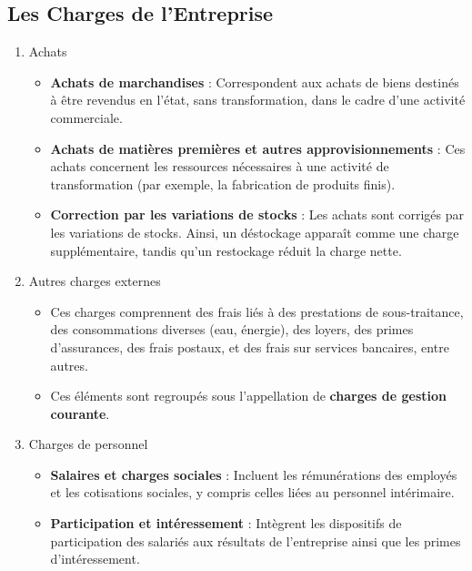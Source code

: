 \documentclass[a4paper, 12pt]{report}
\begin{document}
\subsection{Les Charges de l'Entreprise}
\begin{enumerate}
	\item Achats
\begin{itemize}
	\item \textbf{Achats de marchandises} : Correspondent aux achats de biens destinés à être revendus en l'état, sans transformation, dans le cadre d'une activité commerciale.
	\item \textbf{Achats de matières premières et autres approvisionnements} : Ces achats concernent les ressources nécessaires à une activité de transformation (par exemple, la fabrication de produits finis).
	\item \textbf{Correction par les variations de stocks} : Les achats sont corrigés par les variations de stocks. Ainsi, un déstockage apparaît comme une charge supplémentaire, tandis qu'un restockage réduit la charge nette.
\end{itemize}

\item Autres charges externes
\begin{itemize}
	\item Ces charges comprennent des frais liés à des prestations de sous-traitance, des consommations diverses (eau, énergie), des loyers, des primes d'assurances, des frais postaux, et des frais sur services bancaires, entre autres.
	\item Ces éléments sont regroupés sous l'appellation de \textbf{charges de gestion courante}.
\end{itemize}

\item Charges de personnel
\begin{itemize}
	\item \textbf{Salaires et charges sociales} : Incluent les rémunérations des employés et les cotisations sociales, y compris celles liées au personnel intérimaire.
	\item \textbf{Participation et intéressement} : Intègrent les dispositifs de participation des salariés aux résultats de l'entreprise ainsi que les primes d'intéressement.
\end{itemize}


\end{enumerate}
\end{document}
